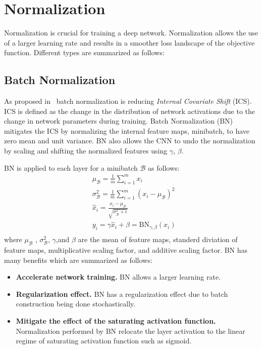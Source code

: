 \section{Normalization}
Normalization is crucial for training a deep network. Normalization allows the use of a larger learning rate and results in a smoother loss landscape of the objective function. Different types are summarized as follows:
\subsection{Batch Normalization}
As proposed in~\cite{ioffe2015batch} batch normalization is reducing {\em  Internal Covariate Shift} (ICS). ICS is defined as the change in the distribution of network activations due to the change in network parameters during training. Batch Normalization (BN) mitigates the ICS by normalizing the internal feature maps, minibatch, to have zero mean and unit variance. BN also allows the CNN to undo the normalization by scaling and shifting the normalized features using $\gamma$, $\beta$. 

BN is applied to each layer for a minibatch $\mathcal{B}$ as follows\cite{ioffe2015batch}:
\begin{equation}
\begin{split}
    & \mu_{\mathcal{B}} = \frac{1}{m}\sum^{m}_{i=1}x_{i}\\
    &  \sigma^{2}_{\mathcal{B}} = \frac{1}{m}\sum^{m}_{i=1}\left(x_{i}-\mu_{\mathcal{B}}\right)^{2}\\
    &  \hat{x}_{i} = \frac{x_{i} - \mu_{\mathcal{B}}}{\sqrt{\sigma^{2}_{\mathcal{B}}+\epsilon}} \\
    &  y_{i} = \gamma\hat{x}_{i} + \beta = \text{BN}_{\gamma, \beta}\left(x_{i}\right) \\
\end{split}
\end{equation}
where $\mu_{\mathcal{B}}$ , $\sigma^{2}_{\mathcal{B}}$, $\gamma$,and $\beta$ are the mean of feature maps, standerd diviation of feature maps, multiplicative scaling factor, and additive scaling factor. BN has many benefits which are summarized as follows:
\begin{itemize}
    \item \textbf{Accelerate network training.} BN allows a larger learning rate.
    \item \textbf{Regularization effect.} BN has a regularization effect due to batch construction being done stochastically.
    \item \textbf{Mitigate the effect of the saturating activation function.} Normalization performed by BN relocate the layer activation to the linear regime of saturating activation function such as sigmoid.
\end{itemize}

